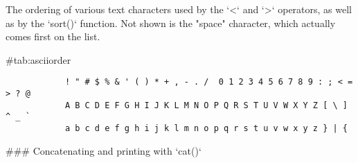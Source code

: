 \begin{table}
\begin{center}
\caption{The ordering of various text characters used by the `<` and `>` operators, as well as by the `sort()` function. Not shown is the "space" character, which actually comes first on the list.}\tabcapsep
{#tab:asciiorder}
\begin{verbatim}
            ! " # $ % & ' ( ) * + , - . /  0 1 2 3 4 5 6 7 8 9 : ; < = > ? @ 
            A B C D E F G H I J K L M N O P Q R S T U V W X Y Z [ \ ]  ^ _ ` 
            a b c d e f g h i j k l m n o p q r s t u v w x y z } | {
\end{verbatim}
\HR
\end{center}
\end{table}






### Concatenating and printing with `cat()`

